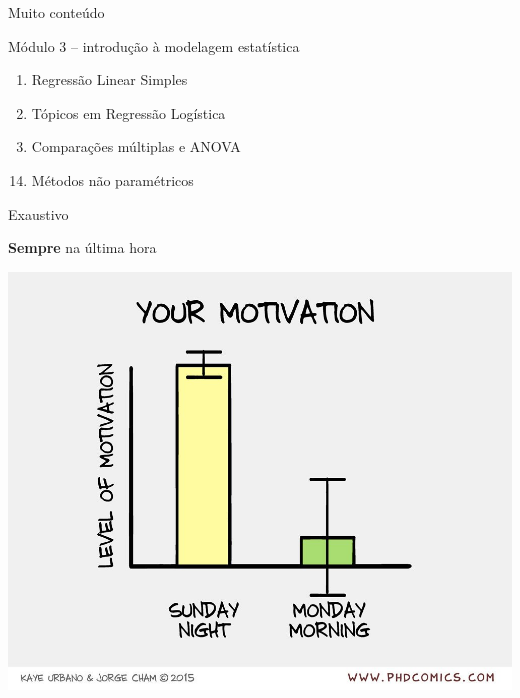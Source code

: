 \documentclass{beamer}
\begin{document}
\begin{frame}{\scriptsize Muito conteúdo}
\begin{block}{\scriptsize Módulo 3 -- introdução à modelagem estatística}
\begin{enumerate}
    \item Regressão Linear Simples

    \item Tópicos em Regressão Logística

    \item Comparações múltiplas e ANOVA

    \end{enumerate}
  \end{block}
  \begin{enumerate}
    \setcounter{enumi}{13}
    \tiny
  \item Métodos não paramétricos

  \end{enumerate}
\end{frame}

\begin{frame}{\scriptsize }
  \begin{center}
    Exaustivo

    \vfill
  \end{center}
\end{frame}

\begin{frame}{\scriptsize {\bf Sempre} na última hora}
  \begin{center}
    \includegraphics[height=.75\textheight]{Encerramento/phdcomics-motivation}

    \vfill
  \end{center}
\end{frame}
\end{document}
